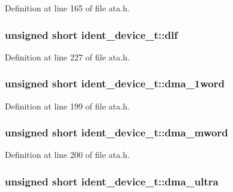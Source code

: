 Definition at line 165 of file ata.\+h.

\subsubsection[{\texorpdfstring{dlf}{dlf}}]{\setlength{\rightskip}{0pt plus 5cm}unsigned short ident\+\_\+device\+\_\+t\+::dlf}\hypertarget{structident__device__t_a4dbb8da5f32a2d02cee8365d22ce3b68}{}\label{structident__device__t_a4dbb8da5f32a2d02cee8365d22ce3b68}


Definition at line 227 of file ata.\+h.

\subsubsection[{\texorpdfstring{dma\+\_\+1word}{dma_1word}}]{\setlength{\rightskip}{0pt plus 5cm}unsigned short ident\+\_\+device\+\_\+t\+::dma\+\_\+1word}\hypertarget{structident__device__t_a478243c429923306e486400604e8bdee}{}\label{structident__device__t_a478243c429923306e486400604e8bdee}


Definition at line 199 of file ata.\+h.

\subsubsection[{\texorpdfstring{dma\+\_\+mword}{dma_mword}}]{\setlength{\rightskip}{0pt plus 5cm}unsigned short ident\+\_\+device\+\_\+t\+::dma\+\_\+mword}\hypertarget{structident__device__t_a125ef700c585b4f13f3ed51f9808ec19}{}\label{structident__device__t_a125ef700c585b4f13f3ed51f9808ec19}


Definition at line 200 of file ata.\+h.

\subsubsection[{\texorpdfstring{dma\+\_\+ultra}{dma_ultra}}]{\setlength{\rightskip}{0pt plus 5cm}unsigned short ident\+\_\+device\+\_\+t\+::dma\+\_\+ultra}\hypertarget{structident__device__t_a380b2b09664f4058c69ab22e54e71c59}{}\label{structident__device__t_a380b2b09664f4058c69ab22e54e71c59}


